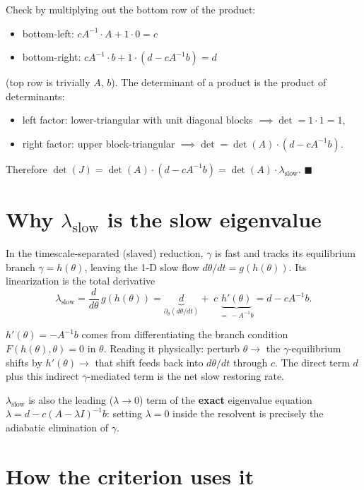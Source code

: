 \documentclass[11pt]{article}
\begin{document}
Check by multiplying out the bottom row of the product:
\begin{itemize}
  \item bottom-left: $cA^{-1}\cdot A + 1\cdot 0 = c$ \checkmark
  \item bottom-right: $cA^{-1}\cdot b + 1\cdot(d - cA^{-1}b) = d$ \checkmark
\end{itemize}

(top row is trivially $A$, $b$). The determinant of a product is the product
of determinants:
\begin{itemize}
  \item left factor: lower-triangular with unit diagonal blocks
        $\implies \det = 1\cdot 1 = 1$,
  \item right factor: upper block-triangular
        $\implies \det = \det(A)\cdot(d - cA^{-1}b)$.
\end{itemize}

Therefore $\det(J) = \det(A)\cdot(d - cA^{-1}b) = \det(A)\cdot\lambda_{\text{slow}}$.
\hfill$\blacksquare$

\section{Why $\lambda_{\text{slow}}$ is the slow eigenvalue}

In the timescale-separated (slaved) reduction, $\gamma$ is fast and tracks its
equilibrium branch $\gamma = h(\theta)$, leaving the 1-D slow flow
$d\theta/dt = g(h(\theta))$. Its linearization is the total derivative
\[
\lambda_{\text{slow}}
= \frac{d}{d\theta}\,g(h(\theta))
= \underbrace{d}_{\partial_\theta(d\theta/dt)}
+ \; c\,\underbrace{h'(\theta)}_{=\,-A^{-1}b}
= d - cA^{-1}b.
\]

$h'(\theta) = -A^{-1}b$ comes from differentiating the branch condition
$F(h(\theta), \theta) = 0$ in $\theta$. Reading it physically: perturb
$\theta \to$ the $\gamma$-equilibrium shifts by $h'(\theta) \to$ that shift
feeds back into $d\theta/dt$ through $c$. The direct term $d$ plus this
indirect $\gamma$-mediated term is the net slow restoring rate.

$\lambda_{\text{slow}}$ is also the leading ($\lambda \to 0$) term of the
\textbf{exact} eigenvalue equation $\lambda = d - c (A - \lambda I)^{-1} b$:
setting $\lambda = 0$ inside the resolvent is precisely the adiabatic
elimination of $\gamma$.

\section{How the criterion uses it}
\end{document}
